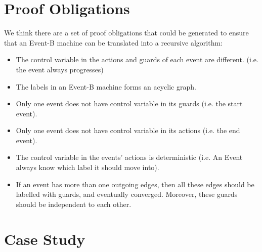 \documentclass{easychair}
\begin{document}
\section{Proof Obligations}
We think there are a set of proof obligations that could be generated to ensure that an Event-B machine can be translated into a recursive algorithm:
\begin{itemize}
	\item The control variable in the actions and guards of each event are different. (i.e. the event always progresses)
	\item The labels in an Event-B machine forms an acyclic graph.
	\item Only one event does not have control variable in its guards (i.e. the start event).
	\item Only one event does not have control variable in its actions (i.e. the end event).
	\item The control variable in the events' actions is deterministic (i.e. An Event always know which label it should move into).
	\item If an event has more than one outgoing edges, then all these edges should be labelled with guards, and eventually converged. Moreover, these guards should be independent to each other.
	
\end{itemize}

\newpage
\section{Case Study}
\end{document}
